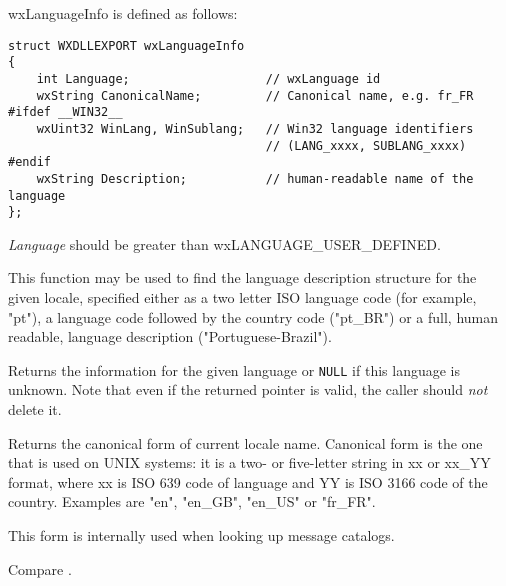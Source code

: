 wxLanguageInfo is defined as follows:

\begin{verbatim}
struct WXDLLEXPORT wxLanguageInfo
{
    int Language;                   // wxLanguage id
    wxString CanonicalName;         // Canonical name, e.g. fr_FR
#ifdef __WIN32__
    wxUint32 WinLang, WinSublang;   // Win32 language identifiers
                                    // (LANG_xxxx, SUBLANG_xxxx)
#endif
    wxString Description;           // human-readable name of the language
};
\end{verbatim}


{\it Language} should be greater than wxLANGUAGE\_USER\_DEFINED.



\label{wxlocalefindlanguageinfo}


This function may be used to find the language description structure for the
given locale, specified either as a two letter ISO language code (for example,
"pt"), a language code followed by the country code ("pt\_BR") or a full, human
readable, language description ("Portuguese-Brazil").

Returns the information for the given language or {\tt NULL} if this language
is unknown. Note that even if the returned pointer is valid, the caller should
{\it not} delete it.




\label{wxlocalegetcanonicalname}


Returns the canonical form of current locale name. Canonical form is the
one that is used on UNIX systems: it is a two- or five-letter string in xx or
xx\_YY format, where xx is ISO 639 code of language and YY is ISO 3166 code of
the country. Examples are "en", "en\_GB", "en\_US" or "fr\_FR".

This form is internally used when looking up message catalogs.

Compare .




